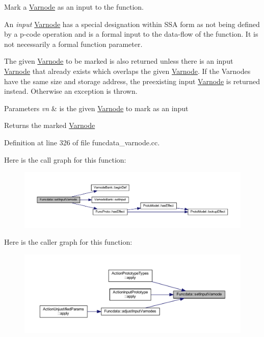 Mark a \mbox{\hyperlink{class_varnode}{Varnode}} as an input to the function. 

An {\itshape input} \mbox{\hyperlink{class_varnode}{Varnode}} has a special designation within S\+SA form as not being defined by a p-\/code operation and is a formal input to the data-\/flow of the function. It is not necessarily a formal function parameter.

The given \mbox{\hyperlink{class_varnode}{Varnode}} to be marked is also returned unless there is an input \mbox{\hyperlink{class_varnode}{Varnode}} that already exists which overlaps the given \mbox{\hyperlink{class_varnode}{Varnode}}. If the Varnodes have the same size and storage address, the preexisting input \mbox{\hyperlink{class_varnode}{Varnode}} is returned instead. Otherwise an exception is thrown. 
\begin{DoxyParams}{Parameters}
{\em vn} & is the given \mbox{\hyperlink{class_varnode}{Varnode}} to mark as an input \\
\hline
\end{DoxyParams}
\begin{DoxyReturn}{Returns}
the marked \mbox{\hyperlink{class_varnode}{Varnode}} 
\end{DoxyReturn}


Definition at line 326 of file funcdata\+\_\+varnode.\+cc.

Here is the call graph for this function\+:
\nopagebreak
\begin{figure}[H]
\begin{center}
\leavevmode
\includegraphics[width=350pt]{class_funcdata_a84a9880613a03f3aea65acf3dd1343d6_cgraph}
\end{center}
\end{figure}
Here is the caller graph for this function\+:
\nopagebreak
\begin{figure}[H]
\begin{center}
\leavevmode
\includegraphics[width=350pt]{class_funcdata_a84a9880613a03f3aea65acf3dd1343d6_icgraph}
\end{center}
\end{figure}
\mbox{\label{class_funcdata_ac33bb4d59a0125d36710fe80453b9526}} 
